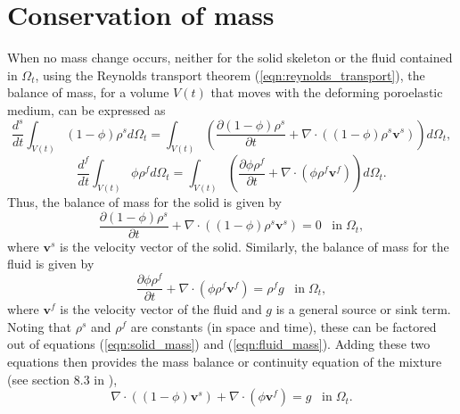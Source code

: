 \section{Conservation of mass}
When no mass change occurs, neither for the solid skeleton or the fluid contained in $\Omega_{t}$, using the Reynolds transport theorem (\ref{eqn:reynolds_transport}), the balance of mass, for a volume $V(t)$ that moves with the deforming poroelastic medium, can be expressed as
\begin{equation*}
\frac{d^{s}}{dt}\int_{V(t)}(1-\phi)\rho^{s}  d \Omega_{t} = \int_{V(t)} \left( \frac{\partial (1-\phi)\rho^{s} }{\partial t} + \nabla \cdot ( (1-\phi)\rho^{s}\boldsymbol{v}^{s}) \right) d \Omega_{t},
\end{equation*}
\begin{equation*}
\frac{d^{f}}{dt}\int_{V(t)}\phi\rho^{f}  d \Omega_{t} = \int_{V(t)} \left( \frac{\partial \phi\rho^{f} }{\partial t} + \nabla \cdot ( \phi\rho^{f} \boldsymbol{v}^{f}) \right) d \Omega_{t}.
\end{equation*}
Thus, the balance of mass for the solid is given by 
\begin{equation}
\frac{\partial (1-\phi)\rho^{s} }{\partial t} + \nabla \cdot ( (1-\phi)\rho^{s}\boldsymbol{v}^{s})=0 \;\;\;\mbox{in}\;\Omega_{t},
\label{eqn:solid_mass}
\end{equation}
where $\boldsymbol{v}^{s}$ is the velocity vector of the solid. Similarly, the balance of mass for the fluid is given by
\begin{equation}
\frac{\partial \phi\rho^{f} }{\partial t} + \nabla \cdot ( \phi\rho^{f} \boldsymbol{v}^{f})=\rho^{f}g \;\;\;\mbox{in}\;\Omega_{t},
\label{eqn:fluid_mass}
\end{equation}
where $\boldsymbol{v}^{f}$ is the velocity vector of the fluid and $g$ is a general source or sink term. Noting that $\rho^{s}$ and $\rho^{f}$ are constants (in space and time), these can be factored out of equations (\ref{eqn:solid_mass}) and (\ref{eqn:fluid_mass}). Adding these two equations then provides the mass balance or continuity equation of the mixture (see section 8.3 in \cite{boer2005trends}),
\begin{equation}
\nabla \cdot((1-\phi) \boldsymbol{v}^{s}) + \nabla \cdot (\phi \boldsymbol{v}^f)=g \;\;\;\mbox{in}\;\Omega_{t}.
\label{eqn:continuity}
\end{equation}


